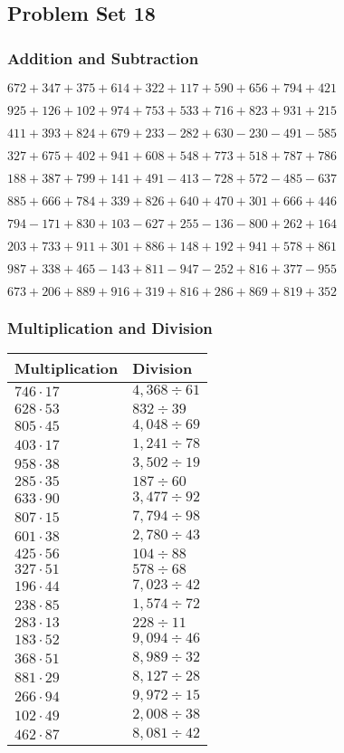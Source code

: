 \hypertarget{problem-set-18-2}{%
\subsection{Problem Set 18}\label{problem-set-18-2}}

\hypertarget{addition-and-subtraction-118}{%
\subsubsection{Addition and
Subtraction}\label{addition-and-subtraction-118}}

\(672 + 347 + 375 + 614 + 322 + 117 + 590 + 656 + 794 + 421\)

\(925 + 126 + 102 + 974 + 753 + 533 + 716 + 823 + 931 + 215\)

\(411 + 393 + 824 + 679 + 233 - 282 + 630 - 230 - 491 - 585\)

\(327 + 675 + 402 + 941 + 608 + 548 + 773 + 518 + 787 + 786\)

\(188 + 387 + 799 + 141 + 491 - 413 - 728 + 572 - 485 - 637\)

\(885 + 666 + 784 + 339 + 826 + 640 + 470 + 301 + 666 + 446\)

\(794 - 171 + 830 + 103 - 627 + 255 - 136 - 800 + 262 + 164\)

\(203 + 733 + 911 + 301 + 886 + 148 + 192 + 941 + 578 + 861\)

\(987 + 338 + 465 - 143 + 811 - 947 - 252 + 816 + 377 - 955\)

\(673 + 206 + 889 + 916 + 319 + 816 + 286 + 869 + 819 + 352\)

\hypertarget{multiplication-and-division-118}{%
\subsubsection{Multiplication and
Division}\label{multiplication-and-division-118}}

\begin{longtable}[]{@{}ll@{}}
\toprule
Multiplication & Division\tabularnewline
\midrule
\endhead
\(746 \cdot 17\) & \(4,368÷61\)\tabularnewline
\(628 \cdot 53\) & \(832÷39\)\tabularnewline
\(805 \cdot 45\) & \(4,048÷69\)\tabularnewline
\(403 \cdot 17\) & \(1,241÷78\)\tabularnewline
\(958 \cdot 38\) & \(3,502÷19\)\tabularnewline
\(285 \cdot 35\) & \(187÷60\)\tabularnewline
\(633 \cdot 90\) & \(3,477÷92\)\tabularnewline
\(807 \cdot 15\) & \(7,794÷98\)\tabularnewline
\(601 \cdot 38\) & \(2,780÷43\)\tabularnewline
\(425 \cdot 56\) & \(104÷88\)\tabularnewline
\(327 \cdot 51\) & \(578÷68\)\tabularnewline
\(196 \cdot 44\) & \(7,023÷42\)\tabularnewline
\(238 \cdot 85\) & \(1,574÷72\)\tabularnewline
\(283 \cdot 13\) & \(228÷11\)\tabularnewline
\(183 \cdot 52\) & \(9,094÷46\)\tabularnewline
\(368 \cdot 51\) & \(8,989÷32\)\tabularnewline
\(881 \cdot 29\) & \(8,127÷28\)\tabularnewline
\(266 \cdot 94\) & \(9,972÷15\)\tabularnewline
\(102 \cdot 49\) & \(2,008÷38\)\tabularnewline
\(462 \cdot 87\) & \(8,081÷42\)\tabularnewline
\bottomrule
\end{longtable}

